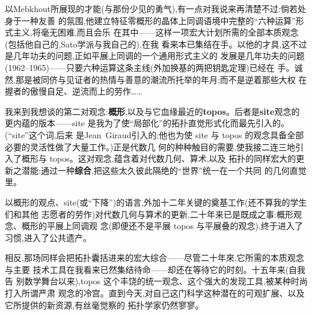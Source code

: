 以Mebkhout所展现的才能(与那份少见的勇气),有一点对我说来再清楚不过:倘若处身于一种友善
的氛围,他建立特征零概形的晶体上同调语境中完整的“六种运算”形式主义,将毫无困难,而且会乐
在其中——这样一项宏大计划所需的全部本质观念(包括他自己的,Sato学派与我自己的),在我
看来本已集结在手。以他的才具,这不过是几年功夫的问题,正如平展上同调的一个通用形式主义的
发展是几年功夫的问题(1962--1965)——只要六种运算这条主线(外加换基的两把钥匙定理)已经在
手。诚然,那是被同侪与见证者的热情与善意的潮流所托举的年月;而不是逆着那些大权
在握者的傲慢自足、逆流而上的劳作……

我来到我想谈的第二对观念:\textbf{概形},以及与它血缘最近的\textbf{topos}。后者是\textbf{site}观念的
更内蕴的版本——site 是我为了使“局部化”的拓扑直觉形式化而最先引入的。(“site”这个词,后来
是Jean~Giraud引入的;他也为使 site 与 topos 的观念具备全部必要的灵活性做了大量工作。)正是代数几
何的种种触目的需要,使我接二连三地引入了概形与 topos。这对观念,蕴含着对代数几何、算术,以及
拓扑的同样宏大的更新之潜能:通过一种\textbf{综合},把这些太久彼此隔绝的“世界”统一在一个共同
的几何直觉里。

以概形的观点、site(或“下降”)的语言,外加十二年关键的奠基工作(还不算我的学生们和其他
志愿者的劳作)对代数几何与算术的更新,二十年来已是既成之事:概形观念、概形的平展上同调观
念(即便还不是平展 topos 与平展叠的观念),终于进入了习惯,进入了公共遗产。

相反,那场同样会把拓扑囊括进来的宏大综合——尽管二十年來,它所需的本质观念与主要
技术工具在我看来已然集结待命——却还在等待它的时刻。\dmark{}十五年来(自我告
别数学舞台以来),topos 这个丰饶的统一观念、这个强大的发现工具,被某种时尚打入所谓严肃
观念的冷宫。直到今天,对自己这门科学这种潜在的可观扩展、以及它所提供的新资源,有丝毫觉察的
拓扑学家仍然寥寥。

